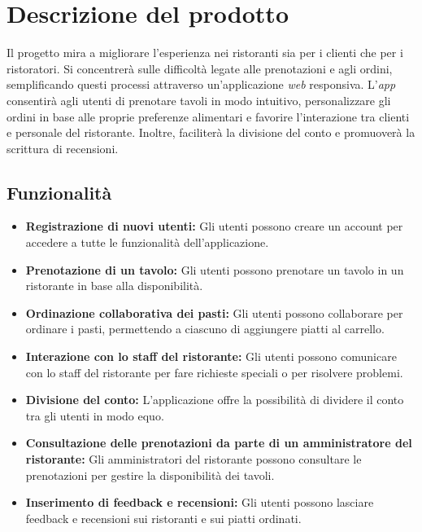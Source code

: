 \section{Descrizione del prodotto}
Il progetto mira a migliorare l'esperienza nei ristoranti sia per i clienti che per i ristoratori. 
Si concentrerà sulle difficoltà legate alle prenotazioni e agli ordini, semplificando questi processi attraverso un'applicazione \textit{web} responsiva. 
L'\textit{app} consentirà agli utenti di prenotare tavoli in modo intuitivo, personalizzare gli ordini in base alle proprie preferenze alimentari e favorire l'interazione tra clienti e personale del ristorante. 
Inoltre, faciliterà la divisione del conto e promuoverà la scrittura di recensioni.

\subsection{Funzionalità}

\begin{itemize}
    \item \textbf{Registrazione di nuovi utenti:} Gli utenti possono creare un account per accedere a tutte le funzionalità dell'applicazione.
    \item \textbf{Prenotazione di un tavolo:} Gli utenti possono prenotare un tavolo in un ristorante in base alla disponibilità.
    \item \textbf{Ordinazione collaborativa dei pasti:} Gli utenti possono collaborare per ordinare i pasti, permettendo a ciascuno di aggiungere piatti al carrello.
    \item \textbf{Interazione con lo staff del ristorante:} Gli utenti possono comunicare con lo staff del ristorante per fare richieste speciali o per risolvere problemi.
    \item \textbf{Divisione del conto:} L'applicazione offre la possibilità di dividere il conto tra gli utenti in modo equo.
    \item \textbf{Consultazione delle prenotazioni da parte di un amministratore del ristorante:} Gli amministratori del ristorante possono consultare le prenotazioni per gestire la disponibilità dei tavoli.
    \item \textbf{Inserimento di feedback e recensioni:} Gli utenti possono lasciare feedback e recensioni sui ristoranti e sui piatti ordinati.
\end{itemize}
    
